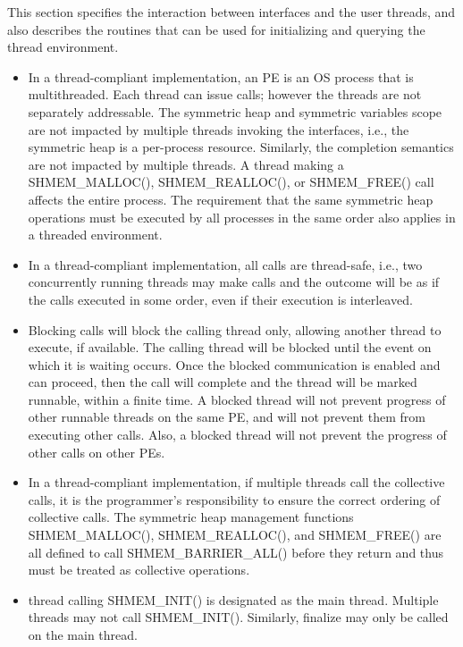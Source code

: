 This section specifies the interaction between \openshmem{} interfaces and the
user threads, and also describes the routines that can be used for initializing and 
querying the thread environment.
 

\begin{itemize}

\item
In a thread-compliant implementation, an \openshmem{} PE is an OS process that
is multithreaded. Each thread can issue \openshmem{} calls; however the threads
are not separately addressable. The symmetric heap and symmetric variables scope
are not impacted by multiple threads invoking the
\openshmem{} interfaces, i.e., the symmetric heap is a per-process resource.
Similarly, the completion semantics are not impacted by multiple threads. A
thread making a SHMEM\_MALLOC(), SHMEM\_REALLOC(), or SHMEM\_FREE() call affects
the entire process. The requirement that the same symmetric heap operations must
be executed by all processes in the same order also applies in a threaded
environment.
                                    	
\item In a thread-compliant implementation, 
all \openshmem{} calls are thread-safe, i.e., two concurrently running threads
may make \openshmem{} calls and the outcome will be as if the calls executed in
some order, even if their execution is interleaved.

\item Blocking \openshmem{} calls will block the calling thread only, allowing another
thread to execute, if available. The calling thread will be blocked until the
event on which it is waiting occurs. Once the blocked communication is enabled
and can proceed, then the call will complete and the thread will be marked
runnable, within a finite time. A blocked thread will not prevent progress of
other runnable threads on the same \ac{PE}, and will not prevent them from
executing other \openshmem{} calls. Also, a blocked thread will not prevent the
progress of other \openshmem{} calls on other \acp{PE}. 
 
\item
In a thread-compliant implementation, if multiple threads call the collective
calls, it is the programmer's responsibility to ensure the correct ordering of
collective calls.  The symmetric heap management functions SHMEM\_MALLOC(),
SHMEM\_REALLOC(), and SHMEM\_FREE() are all defined to call
SHMEM\_BARRIER\_ALL() before they return and thus must be treated as collective
operations.

\item
\openshmem{} thread calling SHMEM\_INIT() is designated as the main thread.
Multiple threads may not call SHMEM\_INIT(). Similarly, \openshmem{} finalize
may only be called on the main thread.

\end{itemize} 
 

